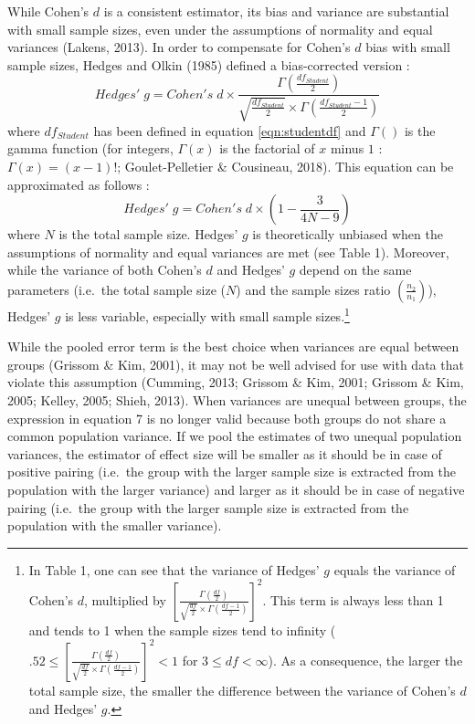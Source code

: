 \documentclass[
  english,
  man,floatsintext]{apa6}
\begin{document}
While Cohen's \(d\) is a consistent estimator, its bias and variance are substantial with small sample sizes, even under the assumptions of normality and equal variances (Lakens, 2013). In order to compensate for Cohen's \(d\) bias with small sample sizes, Hedges and Olkin (1985) defined a bias-corrected version :
\begin{equation*} 
Hedges' \; g = Cohen's \; d \times \frac{\Gamma(\frac{df_{Student}}{2})}{\sqrt{\frac{df_{Student}}{2}} \times \Gamma(\frac{df_{Student}-1}{2})}
\label{eqn:Hedgesgs}
\end{equation*}
where \(df_{Student}\) has been defined in equation \ref{eqn:studentdf} and \(\Gamma()\) is the gamma function (for integers, \(\Gamma(x)\) is the factorial of \(x\) minus \(1\) : \(\Gamma(x)=(x-1)!\); Goulet-Pelletier \(\&\) Cousineau, 2018). This equation can be approximated as follows :
\begin{equation*} 
Hedges' \; g = Cohen's \; d \times \left( 1- \frac{3}{4N -9} \right)
\label{eqn:Hedgesgsapprox}
\end{equation*}
where \(N\) is the total sample size. Hedges' \(g\) is theoretically unbiased when the assumptions of normality and equal variances are met (see Table 1). Moreover, while the variance of both Cohen's \(d\) and Hedges' \(g\) depend on the same parameters (i.e.~the total sample size (\(N\)) and the sample sizes ratio \(\left(\frac{n_2}{n_1}\right)\)), Hedges' \(g\) is less variable, especially with small sample sizes.\footnote{In Table 1, one can see that the variance of Hedges' $g$ equals the variance of Cohen's $d$, multiplied by $\left[\frac{\Gamma(\frac{df}{2})}{\sqrt{\frac{df}{2}} \times \Gamma(\frac{df-1}{2})} \right] ^2$. This term is always less than 1 and tends to 1 when the sample sizes tend to infinity ($.52 \le \left[\frac{\Gamma(\frac{df}{2})}{\sqrt{\frac{df}{2}} \times \Gamma(\frac{df-1}{2})} \right] ^2 < 1$ for $3 \le df < \infty$). As a consequence, the larger the total sample size, the smaller the difference between the variance of Cohen's $d$ and Hedges' $g$.}

While the pooled error term is the best choice when variances are equal between groups (Grissom \& Kim, 2001), it may not be well advised for use with data that violate this assumption (Cumming, 2013; Grissom \& Kim, 2001; Grissom \& Kim, 2005; Kelley, 2005; Shieh, 2013). When variances are unequal between groups, the expression in equation 7 is no longer valid because both groups do not share a common population variance. If we pool the estimates of two unequal population variances, the estimator of effect size will be smaller as it should be in case of positive pairing (i.e.~the group with the larger sample size is extracted from the population with the larger variance) and larger as it should be in case of negative pairing (i.e.~the group with the larger sample size is extracted from the population with the smaller variance).
\end{document}
